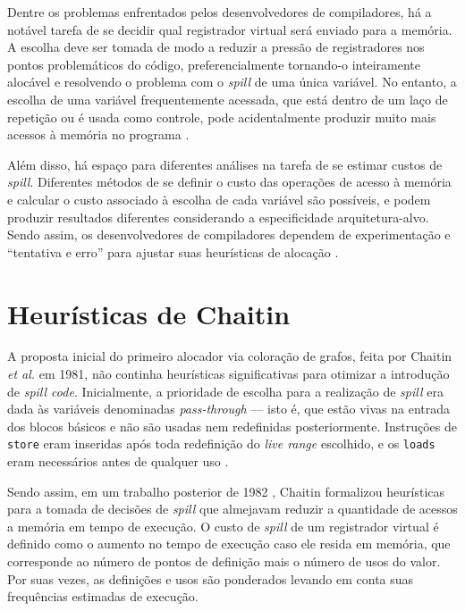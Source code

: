 \documentclass[
	12pt,				%
	openright,			%
	oneside,			%
	a4paper,			%
	tccpreliminar,			%
	]{ABNT-DC-UEL}
\begin{document}
Dentre os problemas enfrentados pelos desenvolvedores de compiladores, há a notável tarefa de se decidir qual registrador virtual será enviado para a memória. A escolha deve ser tomada de modo a reduzir a pressão de registradores nos pontos problemáticos do código, preferencialmente tornando-o inteiramente alocável e resolvendo o problema com o \textit{spill} de uma única variável. No entanto, a escolha de uma variável frequentemente acessada, que está dentro de um laço de repetição ou é usada como controle, pode acidentalmente produzir muito mais acessos à memória no programa \cite{chaitin:82, bernstein:89}.

Além disso, há espaço para diferentes análises na tarefa de se estimar custos de \textit{spill}. Diferentes métodos de se definir o custo das operações de acesso à memória e calcular o custo associado à escolha de cada variável são possíveis, e podem produzir resultados diferentes considerando a especificidade arquitetura-alvo. Sendo assim, os desenvolvedores de compiladores dependem de experimentação e ``tentativa e erro'' para ajustar suas heurísticas de alocação \cite{amarasinghe:03}.

\section{Heurísticas de Chaitin}

A proposta inicial do primeiro alocador via coloração de grafos, feita por Chaitin \textit{et al.} em 1981, não continha heurísticas significativas para otimizar a introdução de \textit{spill code}. Inicialmente, a prioridade de escolha para a realização de \textit{spill} era dada às variáveis denominadas \textit{pass-through} --- isto é, que estão vivas na entrada dos blocos básicos e não são usadas nem redefinidas posteriormente. Instruções de \texttt{store} eram inseridas após toda redefinição do \textit{live range} escolhido, e os \texttt{loads} eram necessários antes de qualquer uso \cite{chaitin:81}.

Sendo assim, em um trabalho posterior de 1982 \cite{chaitin:82}, Chaitin formalizou heurísticas para a tomada de decisões de \textit{spill} que almejavam reduzir a quantidade de acessos a memória em tempo de execução. O custo de \textit{spill} de um registrador virtual é definido como o aumento no tempo de execução caso ele resida em memória, que corresponde ao número de pontos de definição mais o número de usos do valor. Por suas vezes, as definições e usos são ponderados levando em conta suas frequências estimadas de execução.
\end{document}
